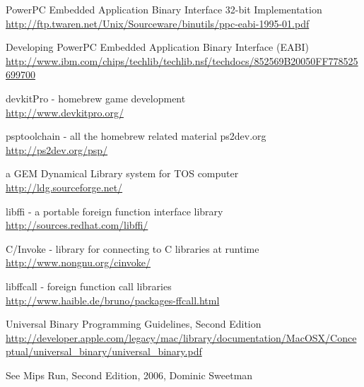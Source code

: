 \begin{thebibliography}{14}
        PowerPC Embedded Application Binary Interface 32-bit Implementation\\
        \url{http://ftp.twaren.net/Unix/Sourceware/binutils/ppc-eabi-1995-01.pdf}

        Developing PowerPC Embedded Application Binary Interface (EABI)\\
        \url{http://www.ibm.com/chips/techlib/techlib.nsf/techdocs/852569B20050FF778525699700}

	devkitPro - homebrew game development\\
	\url{http://www.devkitpro.org/}

	psptoolchain - all the homebrew related material ps2dev.org\\
	\url{http://ps2dev.org/psp/}

	a GEM Dynamical Library system for TOS computer\\
	\url{http://ldg.sourceforge.net/}

	libffi - a portable foreign function interface library\\
	\url{http://sources.redhat.com/libffi/}

	C/Invoke - library for connecting to C libraries at runtime\\
	\url{http://www.nongnu.org/cinvoke/}

	libffcall - foreign function call libraries\\
	\url{http://www.haible.de/bruno/packages-ffcall.html}

        Universal Binary Programming Guidelines, Second Edition\\
        \url{http://developer.apple.com/legacy/mac/library/documentation/MacOSX/Conceptual/universal_binary/universal_binary.pdf}

        See Mips Run, Second Edition, 2006, Dominic Sweetman

\end{thebibliography}


